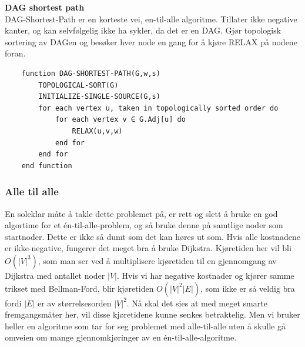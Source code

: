 \noindent\textbf{DAG shortest path}\\
DAG-Shortest-Path er en korteste vei, en-til-alle algoritme. Tillater ikke negative kanter, og kan selvfølgelig ikke ha sykler, da det er en DAG. Gjør topologisk sortering av DAGen og besøker hver node en gang for å kjøre RELAX på nodene foran.

\begin{lstlisting}
    function DAG-SHORTEST-PATH(G,w,s)
    	TOPOLOGICAL-SORT(G)
    	INITIALIZE-SINGLE-SOURCE(G,s)
    	for each vertex u, taken in topologically sorted order do
    		for each vertex v ∈ G.Adj[u] do
    			RELAX(u,v,w)
    		end for
    	end for
    end function

\end{lstlisting}

\subsubsection{Alle til alle}
En soleklar måte å takle dette problemet på, er rett og slett å bruke en god algortime for et én-til-alle-problem, og så bruke denne på samtlige noder som startnoder. Dette er ikke så dumt som det kan høres ut som. Hvis alle kostnadene er ikke-negative, fungerer det meget bra å bruke Dijkstra. Kjøretiden her vil bli $O(|V|^3)$, som man ser ved å multiplisere kjøretiden til en gjennomgang av Dijkstra med antallet noder $|V|$. Hvis vi har negative kostnader og kjører samme trikset med Bellman-Ford, blir kjøretiden $O(|V|^2 |E|)$, som ikke er så veldig bra fordi $|E|$ er av størrelsesorden $|V|^2$. Nå skal det sies at med meget smarte fremgangsmåter her, vil disse kjøretidene kunne senkes betraktelig. Men vi bruker heller en algoritme som tar for seg problemet med alle-til-alle uten å skulle gå omveien om mange gjennomkjøringer av en én-til-alle-algoritme.\\

